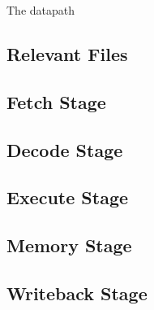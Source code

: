 The datapath

\subsection{Relevant Files}

\subsection{Fetch Stage}

\subsection{Decode Stage}

\subsection{Execute Stage}

\subsection{Memory Stage}

\subsection{Writeback Stage}